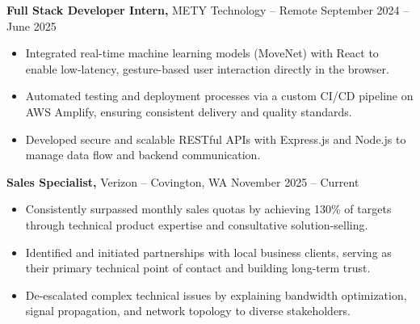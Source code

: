 \documentclass[11pt]{article}       %
\begin{document}
\textbf{Full Stack Developer Intern,} {METY Technology} -- Remote \hfill September 2024 -- June 2025 
\vspace{-9pt}
\begin{itemize}
  \item Integrated real-time machine learning models (MoveNet) with React to enable low-latency, gesture-based user interaction directly in the browser.
  \item Automated testing and deployment processes via a custom CI/CD pipeline on AWS Amplify, ensuring consistent delivery and quality standards.
  \item Developed secure and scalable RESTful APIs with Express.js and Node.js to manage data flow and backend communication.
\end{itemize}

\textbf{Sales Specialist,} {Verizon} -- Covington, WA \hfill November 2025 -- Current \\
\vspace{-9pt}
\begin{itemize}
  \item Consistently surpassed monthly sales quotas by achieving 130\% of targets through technical product expertise and consultative solution-selling.
  \item Identified and initiated partnerships with local business clients, serving as their primary technical point of contact and building long-term trust.
  \item De-escalated complex technical issues by explaining bandwidth optimization, signal propagation, and network topology to diverse stakeholders.
\end{itemize}

\end{document}
